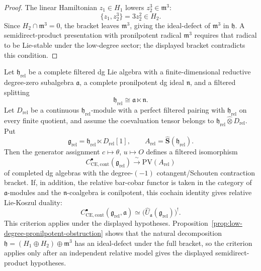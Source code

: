 \documentclass[11pt]{memoir}
\begin{document}
\begin{proof}
  The linear Hamiltonian \(z_1\in H_1\) lowers \(z_2^3\in\mathfrak m^3\):
  \[
    \{z_1,z_2^3\}=3z_2^2\in H_2.
  \]
  Since \(H_2\cap\mathfrak m^3=0\), the bracket leaves \(\mathfrak m^3\),
  giving the ideal-defect of \(\mathfrak m^3\) in \(\mathfrak h\).  A
  semidirect-product presentation with pronilpotent radical
  \(\mathfrak m^3\) requires that radical to be Lie-stable under the
  low-degree sector; the displayed bracket contradicts this condition.
\end{proof}

\begin{thm}\label{thm:relative-filtered-koszul-lift}
  Let \(\mathfrak h_{\mathrm{rel}}\) be a complete filtered dg Lie
  algebra with a finite-dimensional reductive degree-zero subalgebra
  \(\mathfrak a\), a complete pronilpotent dg ideal \(\mathfrak n\),
  and a filtered splitting
  \[
    \mathfrak h_{\mathrm{rel}}\cong\mathfrak a\ltimes\mathfrak n .
  \]
  Let \(D_{\mathrm{rel}}\) be a continuous
  \(\mathfrak h_{\mathrm{rel}}\)-module with a perfect filtered pairing
  with \(\mathfrak h_{\mathrm{rel}}\) on every finite quotient, and
  assume the coevaluation tensor belongs to
  \(\mathfrak h_{\mathrm{rel}}\widehat\otimes D_{\mathrm{rel}}\).  Put
  \[
    \mathfrak g_{\mathrm{rel}}
      =\mathfrak h_{\mathrm{rel}}\ltimes D_{\mathrm{rel}}[1],
    \qquad
    A_{\mathrm{rel}}=\widehat{\mathbf S}(\mathfrak h_{\mathrm{rel}}).
  \]
  Then the generator assignment \(c\mapsto\theta\), \(u\mapsto O\)
  defines a filtered isomorphism
  \[
    C^\bullet_{\mathrm{CE},\mathrm{cont}}(\mathfrak g_{\mathrm{rel}})
    \xrightarrow{\ \sim\ }
    \mathrm{PV}(A_{\mathrm{rel}})
  \]
  of completed dg algebras with the degree-\((-1)\)
  cotangent/Schouten contraction bracket.  If, in addition, the
  relative bar-cobar functor is taken in the category of
  \(\mathfrak a\)-modules and the \(\mathfrak n\)-coalgebra is
  conilpotent, this cochain identity gives relative
  Lie-Koszul duality:
  \[
    C^\bullet_{\mathrm{CE},\mathrm{cont}}(\mathfrak g_{\mathrm{rel}},\mathfrak a)
    \simeq
    \bigl(\widehat U_{\mathfrak a}(\mathfrak g_{\mathrm{rel}})\bigr)^! .
  \]
  This criterion applies under the displayed hypotheses.
  Proposition~\ref{prop:low-degree-pronilpotent-obstruction}
  shows that the natural decomposition
  \(\mathfrak h=(H_1\oplus H_2)\oplus\mathfrak m^3\) has an
  ideal-defect under the full bracket, so the
  criterion applies only after an independent relative model gives
  the displayed semidirect-product hypotheses.
\end{thm}
\end{document}
